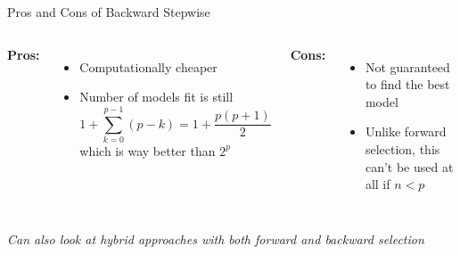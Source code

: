 \documentclass[aspectratio=169,usenames,dvipsnames]{beamer}
\newcommand{\InstructorNotes}[1]{\textit{\color{orange}#1}}
\newcommand{\InstructorList}[1]{
\begin{itemize}
	\color{orange}
	#1
\end{itemize}
}
\begin{document}

\begin{frame}[t]{Pros and Cons of Backward Stepwise}

\begin{columns}
\centering
\textbf{Pros:}

\InstructorList{
\item Computationally cheaper
\item Number of models fit is still
\begin{equation*}
	1 + \sum_{k=0}^{p-1} (p-k) = 1 + \frac{p(p+1)}{2}
\end{equation*}
which is way better than $2^p$
}
\centering
\textbf{Cons:}

\InstructorList{
\item Not guaranteed to find the best model
\item Unlike forward selection, this can't be used at all if $n<p$
}

\end{columns}
\InstructorNotes{Can also look at hybrid approaches with both forward and backward selection}
\end{frame}
\end{document}
